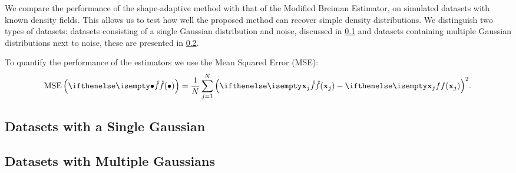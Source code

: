 We compare the performance of the shape-adaptive method with that of the Modified Breiman Estimator, on simulated datasets with known density fields. This allows us to test how well the proposed method can recover simple density distributions. We distinguish two types of datasets: datasets consisting of a single Gaussian distribution and noise, discussed in \cref{s:experiment:singlesphere} and datasets containing multiple Gaussian distributions next to noise, these are presented in \cref{s:experiment:multisphere}.

To quantify the performance of the estimators we use the Mean Squared Error (MSE):
\begin{equation*}
	\varMSE{\varEstimatedDensityFunction{\bullet}} = \frac{1}{\varNumPatterns} \sum_{\itXs = 1}^{\varNumPatterns} {\left(\varEstimatedDensityFunction{\varPattern[\itXs]} - \varDensityFunction{\varPattern[\itXs]} \right)}^2.
\end{equation*}

\subsection{Datasets with a Single Gaussian}
\label{s:experiment:singlesphere}


\subsection{Datasets with Multiple Gaussians}
\label{s:experiment:multisphere}
% 

\oldStuff

